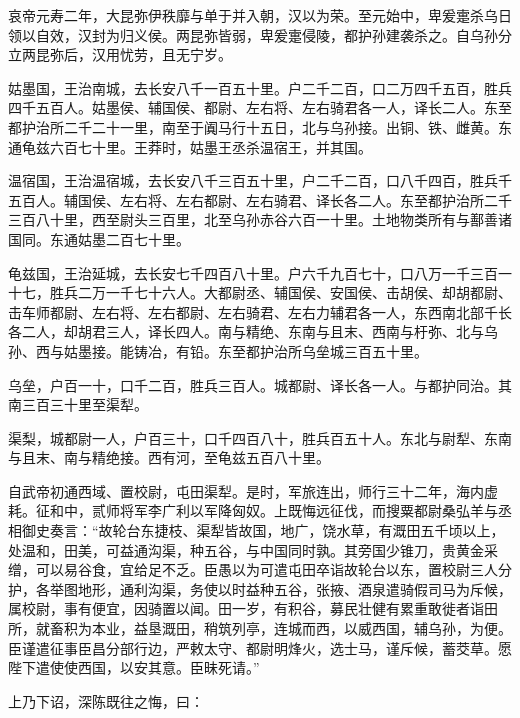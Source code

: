 \documentclass[]{article}
\begin{document}
哀帝元寿二年，大昆弥伊秩靡与单于并入朝，汉以为荣。至元始中，卑爰疐杀乌日领以自效，汉封为归义侯。两昆弥皆弱，卑爰疐侵陵，都护孙建袭杀之。自乌孙分立两昆弥后，汉用忧劳，且无宁岁。

姑墨国，王治南城，去长安八千一百五十里。户二千二百，口二万四千五百，胜兵四千五百人。姑墨侯、辅国侯、都尉、左右将、左右骑君各一人，译长二人。东至都护治所二千二十一里，南至于阗马行十五日，北与乌孙接。出铜、铁、雌黄。东通龟兹六百七十里。王莽时，姑墨王丞杀温宿王，并其国。

温宿国，王治温宿城，去长安八千三百五十里，户二千二百，口八千四百，胜兵千五百人。辅国侯、左右将、左右都尉、左右骑君、译长各二人。东至都护治所二千三百八十里，西至尉头三百里，北至乌孙赤谷六百一十里。土地物类所有与鄯善诸国同。东通姑墨二百七十里。

龟兹国，王治延城，去长安七千四百八十里。户六千九百七十，口八万一千三百一十七，胜兵二万一千七十六人。大都尉丞、辅国侯、安国侯、击胡侯、却胡都尉、击车师都尉、左右将、左右都尉、左右骑君、左右力辅君各一人，东西南北部千长各二人，却胡君三人，译长四人。南与精绝、东南与且末、西南与杅弥、北与乌孙、西与姑墨接。能铸冶，有铅。东至都护治所乌垒城三百五十里。

乌垒，户百一十，口千二百，胜兵三百人。城都尉、译长各一人。与都护同治。其南三百三十里至渠犁。

渠梨，城都尉一人，户百三十，口千四百八十，胜兵百五十人。东北与尉犁、东南与且末、南与精绝接。西有河，至龟兹五百八十里。

自武帝初通西域、置校尉，屯田渠犁。是时，军旅连出，师行三十二年，海内虚耗。征和中，贰师将军李广利以军降匈奴。上既悔远征伐，而搜粟都尉桑弘羊与丞相御史奏言：``故轮台东捷枝、渠犁皆故国，地广，饶水草，有溉田五千顷以上，处温和，田美，可益通沟渠，种五谷，与中国同时孰。其旁国少锥刀，贵黄金采缯，可以易谷食，宜给足不乏。臣愚以为可遣屯田卒诣故轮台以东，置校尉三人分护，各举图地形，通利沟渠，务使以时益种五谷，张掖、酒泉遣骑假司马为斥候，属校尉，事有便宜，因骑置以闻。田一岁，有积谷，募民壮健有累重敢徙者诣田所，就畜积为本业，益垦溉田，稍筑列亭，连城而西，以威西国，辅乌孙，为便。臣谨遣征事臣昌分部行边，严敕太守、都尉明烽火，选士马，谨斥候，蓄茭草。愿陛下遣使使西国，以安其意。臣昧死请。''

上乃下诏，深陈既往之悔，曰：
\end{document}
